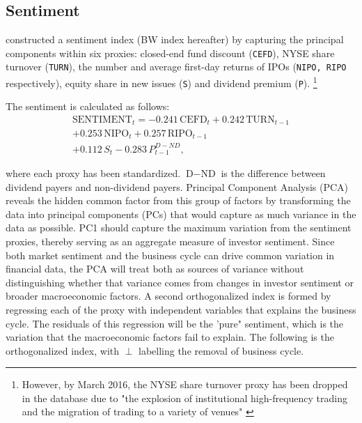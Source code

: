 
\subsection{Sentiment}
 constructed a sentiment index (BW index hereafter) by capturing the principal components within six proxies: closed-end fund discount (\texttt{CEFD}), NYSE share turnover (\texttt{TURN}), the number and average first-day returns of IPOs (\texttt{NIPO, RIPO} respectively), equity share in new issues (\texttt{S}) and dividend premium (\texttt{P}). \footnote{However, by March 2016, the NYSE share turnover proxy has been dropped in the database due to "the explosion of institutional high-frequency trading and the migration of trading to a variety of venues" \cite{ung_2023}}%

The sentiment is calculated as follows:
\begin{equation}
    \label{eq:sentiment}
    \begin{split}
    \text{SENTIMENT}_t = -0.241\,\text{CEFD}_t + 0.242\,\text{TURN}_{t-1} \\ + 0.253\,\text{NIPO}_t 
    + 0.257\,\text{RIPO}_{t-1} \\ + 0.112\,S_t - 0.283\,P^{D-ND}_{t-1} , 
    \end{split}
\end{equation}

where each proxy has been standardized. $\text{D}-\text{ND}$ is the difference between dividend payers and non-dividend payers. Principal Component Analysis (PCA) reveals the hidden common factor from this group of factors by transforming the data into principal components (PCs) that would capture as much variance in the data as possible. PC1 should capture the maximum variation from the sentiment proxies, thereby serving as an aggregate measure of investor sentiment. Since both market sentiment and the business cycle can drive common variation in financial data, the PCA will treat both as sources of variance without distinguishing whether that variance comes from changes in investor sentiment or broader macroeconomic factors. A second orthogonalized index is formed by regressing each of the proxy with independent variables that explains the business cycle. The residuals of this regression will be the 'pure" sentiment, which is the variation that the macroeconomic factors fail to explain. The following is the orthogonalized index, with $\perp$ labelling the removal of business cycle. 

